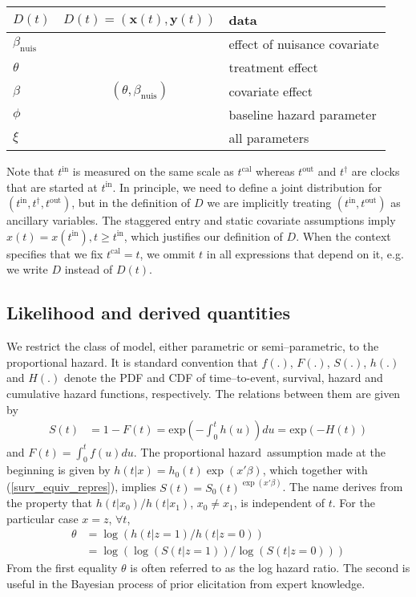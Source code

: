 \documentclass{article}
\newcommand{\tcal}{t^{\mathrm{cal}}}
\newcommand{\tfail}{t^{\dag}}
\newcommand{\tentry}{t^{\mathrm{in}}}
\newcommand{\texit}{t^{\mathrm{out}}}
\newcommand{\survfullcov}{x}
\newcommand{\survdata}{D}
\newcommand{\survdatadef}{data}
\newcommand{\survdataformula}[1]{D(#1)=(\survcovmat(#1),\survrespmat(#1))}
\newcommand{\survcovmat}{\mathbf{x}}
\newcommand{\survrespmat}{\mathbf{y}}
\newcommand{\basehazard}{h_{0}}
\newcommand{\hazard}{h}
\newcommand{\cumHazard}{H}
\newcommand{\basesurv}{S_{0}}
\newcommand{\surv}{S}
\newcommand{\treatindic}{z}
\newcommand{\treateffect}{\theta}
\newcommand{\treateffectdef}{treatment effect}
\newcommand{\survnuiseffect}{\beta_{\mathrm{nuis}}}
\newcommand{\survnuiseffectdef}{effect of nuisance covariate}
\newcommand{\survfulleffect}{\beta}
\newcommand{\survfulleffectformula}{(\treateffect,\survnuiseffect)}
\newcommand{\survfulleffectdef}{covariate effect}
\newcommand{\survfullpar}{\xi}
\newcommand{\survfullpardef}{all parameters}
\newcommand{\survbasepar}{\phi}
\newcommand{\survbasepardef}{baseline hazard parameter}
\newcommand{\ph}{proportional hazard}
\begin{document}
\begin{center}
\begin{tabular}{|l|c|l|}
$\survdata(t)$ & $\survdataformula{t}$& \survdatadef\\\hline
$\survnuiseffect$ & & \survnuiseffectdef\\
$\treateffect$& &\treateffectdef\\
$\survfulleffect$& $\survfulleffectformula$ &\survfulleffectdef\\
$\survbasepar$& &\survbasepardef\\
$\survfullpar$& &\survfullpardef\\
\hline
\end{tabular}
\end{center}Note that $\tentry$ is measured on the same scale as $\tcal$ whereas $\texit$ and $\tfail$ are clocks that are started at $\tentry$. In principle, we need to define a joint distribution for $(\tentry,\tfail,\texit)$, but in the definition of $\survdata$ we are implicitly treating $(\tentry,\texit)$ as ancillary variables. The staggered entry and static covariate assumptions imply $\survfullcov(t)=\survfullcov(\tentry),t\geq\tentry$, which justifies our definition of $\survdata$. When the context specifies that we fix $\tcal=t$, we ommit $t$ in all expressions that depend on it, e.g. we write $\survdata$ instead of $\survdata(t)$.

\subsection{Likelihood and derived quantities}
We restrict the class of model, either parametric or semi--parametric, to the \ph. It is standard convention that $f(.)$, $F(.)$, $\surv(.)$, $\hazard(.)$ and $\cumHazard(.)$ denote the PDF and CDF of time--to-event, survival, hazard and cumulative hazard functions, respectively. The relations between them are given by
\begin{align}\label{surv_equiv_repres}
\surv(t) &= 1-F(t) = \mathrm{exp}\left(-\int_0^t \hazard(u)\right) du = \mathrm{exp}(-\cumHazard(t))
\end{align}and $F(t)=\int_0^t f(u) du$. The \ph\ assumption made at the beginning is given by $\hazard(t|x)= \basehazard(t)\exp(x'\survfulleffect)$, which together with (\ref{surv_equiv_repres}), implies $\surv(t)=\basesurv(t)^{\exp(\survfullcov'\survfulleffect)}$. The name derives from the property that $\hazard(t|\survfullcov_0)/\hazard(t|\survfullcov_1)$, $\survfullcov_0\neq \survfullcov_1$, is independent of $t$. For the particular case $\survfullcov=\treatindic$, $\forall t$, \begin{align}\label{loghazardratio}
\treateffect&=\log(\hazard(t|\treatindic=1)/\hazard(t|\treatindic=0))\\\label{loglogsurvratio}
&=\log\left(\log(S(t|\treatindic=1))/\log(S(t|\treatindic=0))\right)
\end{align}From the first equality $\treateffect$ is often referred to as the log hazard ratio. The second is useful in the Bayesian process of prior elicitation from expert knowledge.
\end{document}
